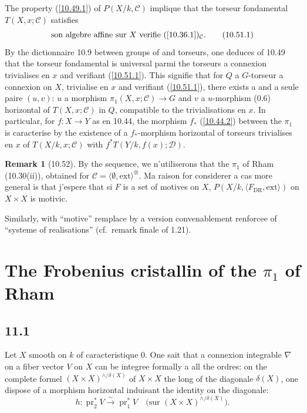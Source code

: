 \documentclass[12pt,a4paper]{article}
\theoremstyle{plain}
\theoremstyle{definition}
\newtheorem{remark}[theorem]{Remark}
\theoremstyle{remark}
\DeclareMathOperator{\pr}{pr}
\newcommand{\DR}{\mathrm{DR}}
\newcommand{\ext}{\mathrm{ext}}
\begin{document}
The property (\ref{10.49.1}) of $P(X/k, \mathcal{C})$ implique that the torseur fondamental $T(X, x; \mathcal{C})$ satisfies
\begin{equation}\label{10.51.1}
\text{son algebre affine sur $X$ verifie (\ref{10.36.1})$_{\mathcal{C}}$.} \tag{10.51.1}
\end{equation}
By the dictionnaire 10.9 between groups of and torseurs, one deduces of 10.49 that the torseur fondamental is universal parmi the torseurs a connexion trivialises en $x$ and verifiant (\ref{10.51.1}). This signifie that for $Q$ a $G$-torseur a connexion on $X$, trivialise en $x$ and verifiant (\ref{10.51.1}), there exists a and a seule paire $(u, v)$: $u$ a morphism $\pi_1(X, x; \mathcal{C}) \to G$ and $v$ a $u$-morphism (0.6) horizontal of $T(X, x; \mathcal{C})$ in $Q$, compatible to the trivialisations en $x$. In particular, for $f: X \to Y$ as en 10.44, the morphism $f_*$ (\ref{10.44.2}) between the $\pi_1$ is caracterise by the existence of a $f_*$-morphism horizontal of torseurs trivialises en $x$ of $T(X/k, x; \mathcal{C})$ with $f^* T(Y/k, f(x); \mathcal{D})$.

\begin{remark}[10.52]
By the sequence, we n'utiliserons that the $\pi_1$ of Rham (10.30(ii)), obtained for $\mathcal{C} = \langle \emptyset, \ext \rangle^{\otimes}$. Ma raison for considerer a cas more general is that j'espere that si $F$ is a set of motives on $X$, $P(X/k, \langle F_{\DR}, \ext \rangle)$ on $X \times X$ is motivic.

Similarly, with ``motive'' remplace by a version convenablement renforcee of ``systeme of realisations'' (cf.~remark finale of 1.21).
\end{remark}


\section{The Frobenius cristallin of the $\pi_1$ of Rham}

\subsection*{11.1}

Let $X$ smooth on $k$ of caracteristique 0. One sait that a connexion integrable $\nabla$ on a fiber vector $V$ on $X$ can be integree formally a all the ordres: on the complete formel $(X \times X)^{\wedge/\delta(X)}$ of $X \times X$ the long of the diagonale $\delta(X)$, one dispose of a morphism horizontal induisant the identity on the diagonale:
\begin{equation}\label{11.1.1}
h: \pr_2^* V \xrightarrow{\sim} \pr_1^* V \quad \text{(sur } (X \times X)^{\wedge/\delta(X)}\text{)}. \tag{11.1.1}
\end{equation}
\end{document}
